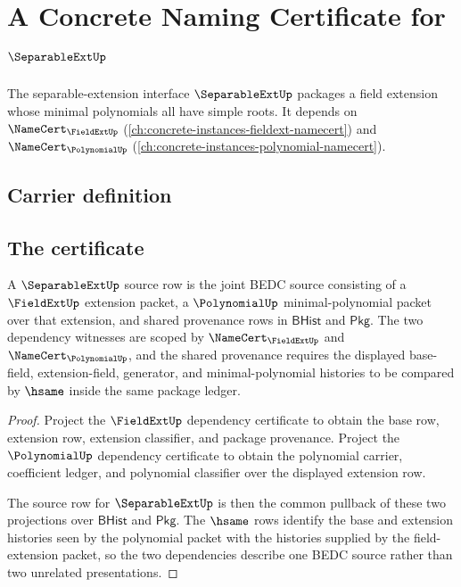 \chapter{A Concrete Naming Certificate for $\SeparableExtUp$}
\label{ch:concrete-instances-separableext-namecert}

The separable-extension interface $\SeparableExtUp$ packages a field extension whose minimal polynomials all have simple roots. It depends on $\NameCert_{\FieldExtUp}$ (\autoref{ch:concrete-instances-fieldext-namecert}) and $\NameCert_{\PolynomialUp}$ (\autoref{ch:concrete-instances-polynomial-namecert}).

\section{Carrier definition}
\label{sec:separableext-carrier}

\section{The certificate}
\label{sec:separableext-certificate}

\begin{theorem}
\label{thm:separableext-fieldext-polynomial-source}
A $\SeparableExtUp$ source row is the joint BEDC source consisting of a $\FieldExtUp$ extension packet, a $\PolynomialUp$ minimal-polynomial packet over that extension, and shared provenance rows in $\mathsf{BHist}$ and $\mathsf{Pkg}$. The two dependency witnesses are scoped by $\NameCert_{\FieldExtUp}$ and $\NameCert_{\PolynomialUp}$, and the shared provenance requires the displayed base-field, extension-field, generator, and minimal-polynomial histories to be compared by $\hsame$ inside the same package ledger.
\end{theorem}
\begin{proof}
Project the $\FieldExtUp$ dependency certificate to obtain the base row, extension row, extension classifier, and package provenance. Project the $\PolynomialUp$ dependency certificate to obtain the polynomial carrier, coefficient ledger, and polynomial classifier over the displayed extension row.

The source row for $\SeparableExtUp$ is then the common pullback of these two projections over $\mathsf{BHist}$ and $\mathsf{Pkg}$. The $\hsame$ rows identify the base and extension histories seen by the polynomial packet with the histories supplied by the field-extension packet, so the two dependencies describe one BEDC source rather than two unrelated presentations.
\end{proof}

